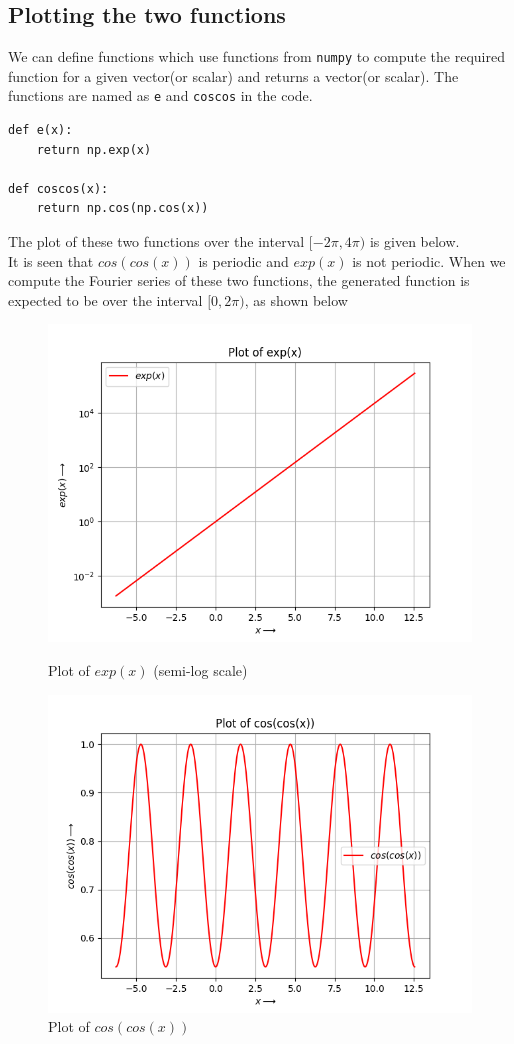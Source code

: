\documentclass[12pt, a4paper]{article}
\begin{document}
\subsection{Plotting the two functions}
	We can define functions which use functions from \texttt{numpy} to compute the required function for a given vector(or scalar) and returns a vector(or scalar). The functions are named as \texttt{e} and \texttt{coscos} in the code.
\begin{lstlisting}
def e(x):
    return np.exp(x)

def coscos(x):
    return np.cos(np.cos(x))	
\end{lstlisting}
	The plot of these two functions over the interval $[-2\pi, 4\pi)$ is given below.\\
	It is seen that $cos(cos(x))$ is periodic and $exp(x)$ is not periodic. When we compute the Fourier series of these two functions, the generated function is expected to be over the interval $[0, 2\pi)$, as shown below
	\begin{figure}[H]
		\centering
		\includegraphics[scale=0.75]{Figure_1.png}
		\caption{Plot of $exp(x)$ (semi-log scale)}
		\centering
		\includegraphics[scale=0.75]{Figure_2.png}
		\caption{Plot of $cos(cos(x))$}
	\end{figure}
\end{document}
